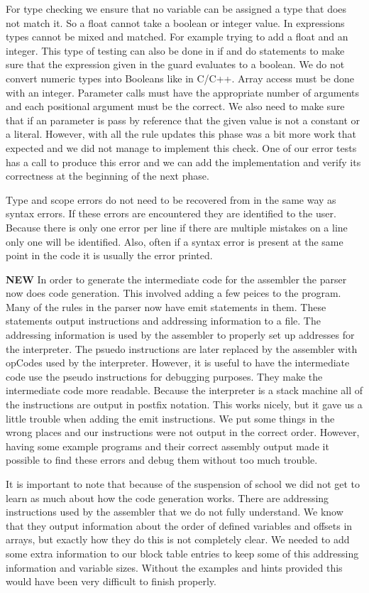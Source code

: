 \documentclass{article}
\begin{document}
For type checking we ensure that no variable can be assigned a type that does not match it.
So a float cannot take a boolean or integer value. In expressions types cannot be
mixed and matched. For example trying to add a float and an integer. This type of
testing can also be done in if and do statements to make sure that the expression
given in the guard evaluates to a boolean. We do not convert numeric types into Booleans
like in C/C++. Array access must be done with an integer. Parameter calls must have
the appropriate number of arguments and each positional argument must be the correct.
We also need to make sure that if an parameter is pass by reference that the given value
is not a constant or a literal. However, with all the rule updates this phase was a bit
more work that expected and we did not manage to implement this check. One of our error tests
has a call to produce this error and we can add the implementation and verify its
correctness at the beginning of the next phase.

Type and scope errors do not need to be recovered from in the same way as syntax
errors. If these errors are encountered they are identified to the user. Because
there is only one error per line if there are multiple mistakes on a line only one
will be identified. Also, often if a syntax error is present at the same point in the
code it is usually the error printed.

\textbf{NEW} In order to generate the intermediate code for the assembler the
parser now does code generation. This involved adding a few peices to the program.
Many of the rules in the parser now have emit statements in them. These statements
output instructions and addressing information to a file. The addressing information
is used by the assembler to properly set up addresses for the interpreter. The
psuedo instructions are later replaced by the assembler with opCodes used by
the interpreter. However, it is useful to have the intermediate code use the
pseudo instructions for debugging purposes. They make the intermediate code more
readable. Because the interpreter is a stack machine all of the instructions
are output in postfix notation. This works nicely, but it gave us a little trouble
when adding the emit instructions. We put some things in the wrong places and
our instructions were not output in the correct order. However, having some
example programs and their correct assembly output made it possible to find these
errors and debug them without too much trouble.

It is important to note that because of the suspension of school we did not get
to learn as much about how the code generation works. There are addressing
instructions used by the assembler that we do not fully understand. We know
that they output information about the order of defined variables and offsets
in arrays, but exactly how they do this is not completely clear. We needed to
add some extra information to our block table entries to keep some of this
addressing information and variable sizes. Without the examples and hints
provided this would have been very difficult to finish properly.
\end{document}
